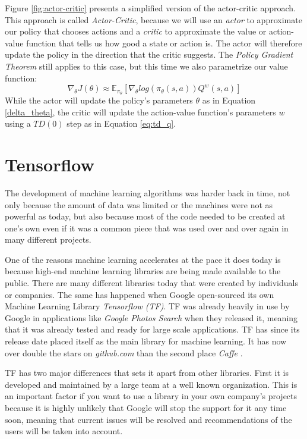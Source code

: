 Figure \ref{fig:actor-critic} presents a simplified version of the actor-critic approach.
This approach is called \emph{Actor-Critic}, because we will use an \emph{actor} to approximate our policy that chooses actions and a \emph{critic} to approximate the value or action-value function that tells us how good a state or action is.
The actor will therefore update the policy in the direction that the critic suggests.
The \emph{Policy Gradient Theorem} still applies to this case, but this time we also parametrize our value function:
\begin{equation} \label{eq:a_c_p_g}
 \nabla_{\theta}J(\theta) \approx \mathbb{E}_{\pi_{\theta}}[\nabla_{\theta}log(\pi_{\theta}(s,a))Q^{w}(s,a)]
\end{equation}
While the actor will update the policy's parameters $\theta$ as in Equation \ref{delta_theta}, the critic will update the action-value function's parameters $w$ using a $TD(0)$ step as in Equation \ref{eq:td_q}.


\section{Tensorflow}

The development of machine learning algorithms was harder back in time, not only because the amount of data was limited or the machines were not as powerful as today, but also because most of the code needed to be created at one's own even if it was a common piece that was used over and over again in many different projects.


One of the reasons machine learning accelerates at the pace it does today is because high-end machine learning libraries are being made available to the public.
There are many different libraries today that were created by individuals or companies.
The same has happened when Google open-sourced its own Machine Learning Library \emph{Tensorflow (TF)}.
TF was already heavily in use by Google in applications like \emph{Google Photos Search} \cite{tensorflow} when they released it, meaning that it was already tested and ready for large scale applications.
TF has since its release date placed itself as the main library for machine learning.
It has now over double the stars on \emph{github.com} than the second place \emph{Caffe} \cite{github_stars}.


TF has two major differences that sets it apart from other libraries.
First it is developed and maintained by a large team at a well known organization.
This is an important factor if you want to use a library in your own company's projects because it is highly unlikely that Google will stop the support for it any time soon, meaning that current issues will be resolved and recommendations of the users will be taken into account.


